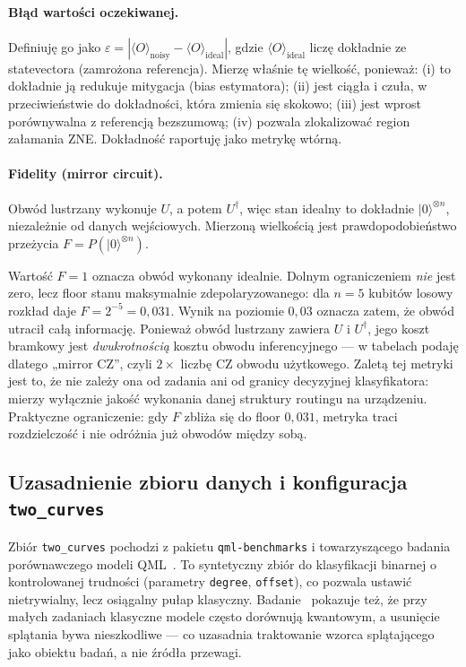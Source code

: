 \documentclass[11pt,a4paper]{article}
\begin{document}
\paragraph{Błąd wartości oczekiwanej.} Definiuję go jako
$\varepsilon = |\langle O\rangle_{\text{noisy}} - \langle O\rangle_{\text{ideal}}|$, gdzie
$\langle O\rangle_{\text{ideal}}$ liczę dokładnie ze statevectora (zamrożona referencja).
Mierzę właśnie tę wielkość, ponieważ: (i) to dokładnie ją redukuje mitygacja (bias
estymatora); (ii) jest ciągła i czuła, w przeciwieństwie do dokładności, która zmienia się skokowo; (iii) jest wprost porównywalna z referencją bezszumową;
(iv) pozwala zlokalizować region załamania ZNE. Dokładność raportuję jako metrykę wtórną.

\paragraph{Fidelity (mirror circuit).} Obwód lustrzany wykonuje $U$, a potem $U^{\dagger}$,
więc stan idealny to dokładnie $|0\rangle^{\otimes n}$, niezależnie od danych wejściowych.
Mierzoną wielkością jest prawdopodobieństwo przeżycia $F = P(|0\rangle^{\otimes n})$.

Wartość $F=1$ oznacza obwód wykonany idealnie. Dolnym
ograniczeniem \emph{nie} jest zero, lecz floor stanu maksymalnie zdepolaryzowanego: dla
$n=5$ kubitów losowy rozkład daje $F = 2^{-5} = 0{,}031$. Wynik na poziomie $0{,}03$ oznacza
zatem, że obwód utracił całą informację. Ponieważ obwód lustrzany zawiera $U$ i $U^{\dagger}$,
jego koszt bramkowy jest \emph{dwukrotnością} kosztu obwodu inferencyjnego --- w tabelach
podaję dlatego „mirror CZ”, czyli $2\times$ liczbę CZ obwodu użytkowego. Zaletą tej metryki
jest to, że nie zależy ona od zadania ani od granicy decyzyjnej klasyfikatora: mierzy
wyłącznie jakość wykonania danej struktury routingu na urządzeniu. Praktyczne ograniczenie:
gdy $F$ zbliża się do floor $0{,}031$, metryka traci rozdzielczość i nie odróżnia już
obwodów między sobą.

\subsection{Uzasadnienie zbioru danych i konfiguracja \texttt{two\_curves}}

Zbiór \texttt{two\_curves} pochodzi z pakietu \texttt{qml-benchmarks} i towarzyszącego
badania porównawczego modeli QML~\cite{bowles2024}. To syntetyczny zbiór do klasyfikacji
binarnej o kontrolowanej trudności (parametry \texttt{degree}, \texttt{offset}), co pozwala
ustawić nietrywialny, lecz osiągalny pułap klasyczny. Badanie~\cite{bowles2024} pokazuje też,
że przy małych zadaniach klasyczne modele często dorównują kwantowym, a usunięcie splątania
bywa nieszkodliwe --- co uzasadnia traktowanie wzorca splątającego jako obiektu badań, a nie
źródła przewagi.
\end{document}
